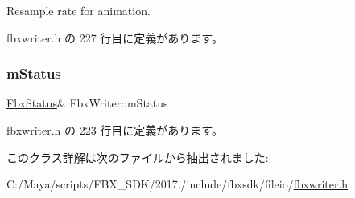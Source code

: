 Resample rate for animation. 



 fbxwriter.\+h の 227 行目に定義があります。

\mbox{\label{class_fbx_writer_a57ea7c7d264738b21442e7abb19c4e14}} 
\subsubsection{\texorpdfstring{m\+Status}{mStatus}}
{\footnotesize\ttfamily \hyperlink{class_fbx_status}{Fbx\+Status}\& Fbx\+Writer\+::m\+Status\hspace{0.3cm}{\ttfamily [protected]}}



 fbxwriter.\+h の 223 行目に定義があります。



このクラス詳解は次のファイルから抽出されました\+:\begin{DoxyCompactItemize}
\item 
C\+:/\+Maya/scripts/\+F\+B\+X\+\_\+\+S\+D\+K/2017./include/fbxsdk/fileio/\hyperlink{fbxwriter_8h}{fbxwriter.\+h}\end{DoxyCompactItemize}
